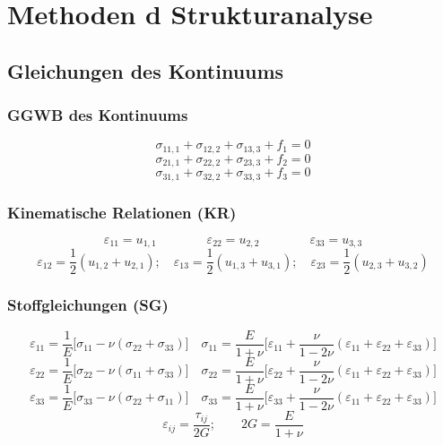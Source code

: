 \section{Methoden d Strukturanalyse}
    \subsection{Gleichungen des Kontinuums}
        \subsubsection{GGWB des Kontinuums}
            \small
            \[\sigma_{11,1} + \sigma_{12,2} + \sigma_{13,3} + f_1 = 0\]
            \[\sigma_{21,1} + \sigma_{22,2} + \sigma_{23,3} + f_2 = 0\]
            \[\sigma_{31,1} + \sigma_{32,2} + \sigma_{33,3} + f_3 = 0\]
            
        \subsubsection{Kinematische Relationen (KR)}
            \[\varepsilon_{11} = u_{1,1}\qquad\qquad\varepsilon_{22} = u_{2,2}\qquad\qquad\varepsilon_{33} = u_{3,3}\]
            \[\varepsilon_{12} = \frac{1}{2}(u_{1,2} + u_{2,1});\quad\varepsilon_{13} = \frac{1}{2}(u_{1,3} + u_{3,1});\quad\varepsilon_{23} = \frac{1}{2}(u_{2,3} + u_{3,2})\]
            
        \subsubsection{Stoffgleichungen (SG)}
            \[\varepsilon_{11} = \frac{1}{E}\lbrack\sigma_{11} - \nu(\sigma_{22} + \sigma_{33})\rbrack \quad \sigma_{11}=\frac{E}{1+\nu}\lbrack\varepsilon_{11}+\frac{\nu}{1-2\nu}(\varepsilon_{11}+\varepsilon_{22}+\varepsilon_{33})\rbrack\]
            \[\varepsilon_{22} = \frac{1}{E}\lbrack\sigma_{22} - \nu(\sigma_{11} + \sigma_{33})\rbrack \quad \sigma_{22}=\frac{E}{1+\nu}\lbrack\varepsilon_{22}+\frac{\nu}{1-2\nu}(\varepsilon_{11}+\varepsilon_{22}+\varepsilon_{33})\rbrack\]
            \[\varepsilon_{33} = \frac{1}{E}\lbrack\sigma_{33} - \nu(\sigma_{22} + \sigma_{11})\rbrack \quad \sigma_{33}=\frac{E}{1+\nu}\lbrack\varepsilon_{33}+\frac{\nu}{1-2\nu}(\varepsilon_{11}+\varepsilon_{22}+\varepsilon_{33})\rbrack\]
            \[\varepsilon_{ij}=\frac{\tau_{ij}}{2G}; \qquad 2G=\frac{E}{1+\nu}\]
            \normalsize

    